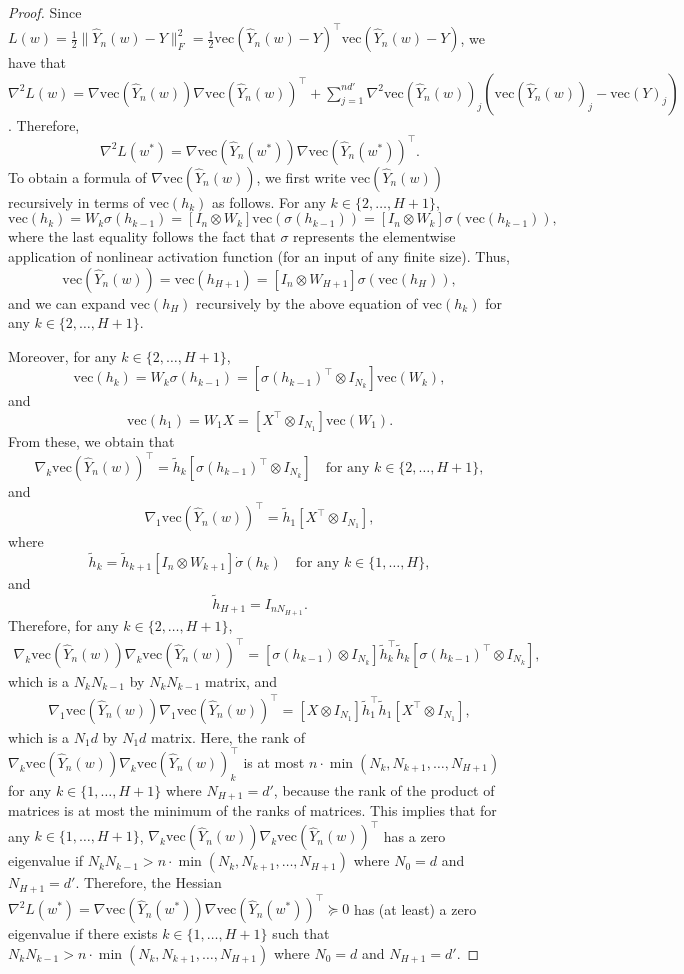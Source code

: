 \documentclass[10pt]{article}
\newcommand{\vect}{\mathrm{vec}}
\begin{document}
\begin{proof}
Since $L(w)=\frac{1}{2} \|\hat Y_n(w) -Y\|^2_F=\frac{1}{2}\vect(\hat Y_n(w) -Y)^\top \vect(\hat Y_n(w) -Y)$, we have that $\nabla^2 L(w) = \nabla \vect(\hat Y_n(w)) \nabla \vect(\hat Y_n(w))^\top + \sum_{j=1}^{nd'}
\nabla^2 \vect(\hat Y_n(w))_j (\vect(\hat Y_n(w))_j - \vect(Y)_{j})$. Therefore,
$$
\nabla^2 L(w^{*}) = \nabla \vect(\hat Y_n(w^*)) \nabla \vect(\hat Y_n(w^*))^\top . 
$$
To obtain a formula of $\nabla \vect(\hat Y_n(w))$, we first write $\vect(\hat Y_n(w))$ recursively in terms of $\vect(h_k)$ as follows. For any $k \in\{2,\dots,H+1\}$,
$$
\vect(h_k) = W_{k} \sigma(h_{k-1}) = [I_n \otimes W_k] \vect(\sigma(h_{k-1}))=[I_n \otimes W_k] \sigma(\vect(h_{k-1})), 
$$
where the last equality follows the fact that $\sigma$ represents the elementwise application of nonlinear activation function (for an input of any  finite size). Thus, 
$$
\vect(\hat Y_n(w)) = \vect(h_{H+1})=[I_n \otimes W_{H+1}] \sigma(\vect(h_{H})),
$$ 
and we can expand $\vect(h_{H})$ recursively by the above equation of $\vect(h_k)$ for any $k \in\{2,\dots,H+1\}$. 

Moreover, for any $k \in\{2,\dots,H+1\}$,
$$  
\vect(h_k) = W_{k} \sigma(h_{k-1}) = [\sigma(h_{k-1})^\top \otimes I_{N_k}] \vect(W_k),
$$
and 
$$
\vect(h_1) =W_{1} X= [X^\top \otimes I_{N_1}] \vect(W_1). 
$$
From these, we obtain that $$
\nabla_k \vect(\hat Y_n(w))^{\top} = \tilde h_k [\sigma(h_{k-1})^\top \otimes I_{N_k}] \ \ \ \text{ for any } k \in \{2,\dots,H+1\},  
$$
and 
$$
\nabla_1 \vect(\hat Y_n(w))^{\top} = \tilde h_1 [X^{\top}\otimes I_{N_1}],
$$
where 
$$
\tilde h_k = \tilde h_{k+1} [I_{n} \otimes W_{k+1}]  \dot \sigma(h_k) \ \ \ \text{ for any } k \in \{1,\dots,H\},
$$
and 
$$
\tilde h_{H+1} = I_{nN_{H+1}}. 
$$
Therefore, for any $k \in \{2,\dots,H+1\}$,
\begin{align*}
\nabla_k \vect(\hat Y_n(w)) \nabla_k \vect(\hat Y_n(w))^{\top} 
=[\sigma(h_{k-1}) \otimes I_{N_k}]  \tilde h_k^{\top}  \tilde h_k [\sigma(h_{k-1})^\top \otimes I_{N_k}],
\end{align*}
which is a $N_{k} N_{k-1}$ by $N_{k} N_{k-1}$ matrix, and 
\begin{align*}
\nabla_1 \vect(\hat Y_n(w)) \nabla_1 \vect(\hat Y_n(w))^{\top} 
=[X\otimes I_{N_1}]  \tilde h_1^{\top}   \tilde h_1 [X^{\top}\otimes I_{N_1}],
\end{align*}
which is a $N_{1} d$ by $N_{1} d$ matrix.
Here, the rank of
$\nabla_k \vect(\hat Y_n(w)) \nabla_k \vect(\hat Y_n(w))^{\top} 
_k$ is at most $n \cdot \min(N_{k},N_{k+1},\dots,N_{H+1})$ for any $k \in \{1,\dots,H+1\}$
where $N_{H+1}=d'$, because the rank of the product of matrices is at most the minimum
of the ranks of matrices. This implies that for any $k \in \{1,\dots,H+1\}$,
 $\nabla_k \vect(\hat Y_n(w)) \nabla_k \vect(\hat Y_n(w))^{\top}$ has a zero eigenvalue if $N_{k} N_{k-1} >n \cdot \min(N_{k},N_{k+1},\dots,N_{H+1})$ where $N_0 =d$ and  $N_{H+1}=d'$. 
Therefore, the Hessian $\nabla^2 L(w^{*}) = \nabla \vect(\hat Y_n(w^*)) \nabla \vect(\hat Y_n(w^*))^\top \succeq 0$ has (at least) a zero eigenvalue if there exists $k\in \{1,\dots,H+1\}$ such that $N_{k} N_{k-1} >n \cdot \min(N_{k},N_{k+1},\dots,N_{H+1})$ where $N_0 =d$ and  $N_{H+1}=d'$.


\end{proof}
\end{document}
